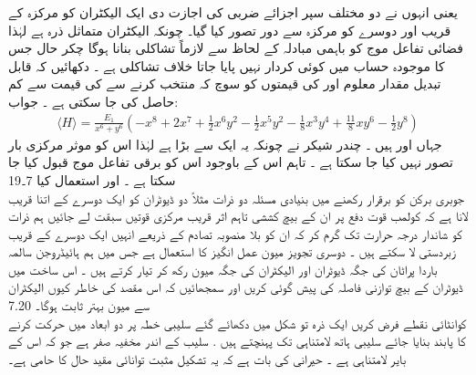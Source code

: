 یعنی انہوں نے دو مختلف سپر اجزائے ضربی کی اجازت دی ایک الیکٹران کو مرکزہ کے قریب اور دوسرے کو مرکزہ سے دور تصور کیا گیا۔ چونکہ الیکٹران متماثل ذرہ ہے لہٰذا فضائی تفاعل موج کو باہمی مبادلہ کے لحاظ سے لازماً تشاکلی بنانا ہوگا چکر حال جس کا موجودہ حساب میں کوئی کردار نہیں پایا جاتا خلاف تشاکلی ہے ۔ دکھائیں کہ قابل تبدیل مقدار معلوم  اور  کی قیمتوں کو سوچ کہ منتخب کرنے سے  کی قیمت  سے کم حاصل کی جا سکتی ہے ۔
جواب:
\begin{align}
\langle H \rangle = \frac{E_{1}}{x^{6}+y^{6}}(-x^{8}+2x^{7}+\frac{1}{2}x^{6}y^{2}-\frac{1}{2}x^{5}y^{2}-\frac{1}{8}x^{3}y^{4}+\frac{11}{8}xy^{6}-\frac{1}{2}y^{8})
\end{align}
 جہاں  اور  ہیں ۔ چندر شیکر نے  چونکہ یہ ایک سے بڑا ہے لہٰذا اس کو موثر مرکزی بار تصور نہیں کیا جا سکتا ہے ۔ تاہم اس کے باوجود اس کو برقی تفاعل موج قبول کیا جا سکتا ہے ۔ اور  استعمال کیا
7۔19\\
جوبری برکن کو برقرار رکھنے میں بنیادی مسئلہ دو ذرات مثلاً دو ڈیوٹران کو ایک دوسرے کے اتنا قریب لانا ہے کہ کولمب قوت دفع پر ان کے بیچ کششی تاہم اثر قریب مرکزی قوتیں سبقت لے جائیں ہم ذرات کو شاندار درجہ حرارت تک گرم کر کہ ان کو بلا منصوبہ  تصادم کے ذریعے انہیں ایک دوسرے کے قریب زبردستی لا سکتے  ہیں ۔ دوسری تجویز میون عمل انگیز کا استعمال ہے جس میں ہم ہائیڈروجن سالمہ باردا پراٹان کی جگہ ڈیوٹران اور الیکٹران کی جگہ میون رکھ کر تیار کرتے ہیں ۔ اس ساخت میں ڈیوٹران کے بیچ توازنی فاصلہ کی پیش گوئی کریں   اور سمجھائیں کہ اس مقصد کی خاطر کیوں الیکٹران سے میون بہتر ثابت ہوگا۔
7.20\\
کوانٹائی نقطے فرض کریں ایک ذرہ تو شکل  میں دکھائے گئے سلیبی خطہ پر دو ابعاد میں حرکت کرنے کا پابند بنایا جائے سلیبی ہاتھ لامتناہی تک پہنچتے ہیں . سلیب کے اندر مخفیہ صفر ہے جو کہ اس کے بایر لامتناہی ہے ۔ حیرانی کی بات ہے کہ یہ تشکیل مثبت توانائی مقید حال کا حامی ہے۔

